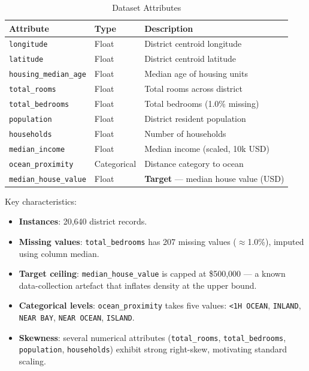 \documentclass[conference]{IEEEtran}
\begin{document}
\begin{table}[H]
\centering
\caption{Dataset Attributes}
\label{tab:attributes}
\begin{tabular}{@{}llp{3.5cm}@{}}
\toprule
\textbf{Attribute} & \textbf{Type} & \textbf{Description} \\
\midrule
\texttt{longitude}           & Float   & District centroid longitude \\
\texttt{latitude}            & Float   & District centroid latitude \\
\texttt{housing\_median\_age}& Float   & Median age of housing units \\
\texttt{total\_rooms}        & Float   & Total rooms across district \\
\texttt{total\_bedrooms}     & Float   & Total bedrooms (1.0\% missing) \\
\texttt{population}          & Float   & District resident population \\
\texttt{households}          & Float   & Number of households \\
\texttt{median\_income}      & Float   & Median income (scaled, 10k USD) \\
\texttt{ocean\_proximity}    & Categorical & Distance category to ocean \\
\midrule
\texttt{median\_house\_value}& Float   & \textbf{Target} — median house value (USD) \\
\bottomrule
\end{tabular}
\end{table}

Key characteristics:
\begin{itemize}
    \item \textbf{Instances}: 20,640 district records.
    \item \textbf{Missing values}: \texttt{total\_bedrooms} has 207 missing values ($\approx$1.0\%), imputed using column median.
    \item \textbf{Target ceiling}: \texttt{median\_house\_value} is capped at \$500,000 — a known data-collection artefact that inflates density at the upper bound.
    \item \textbf{Categorical levels}: \texttt{ocean\_proximity} takes five values: \texttt{<1H OCEAN}, \texttt{INLAND}, \texttt{NEAR BAY}, \texttt{NEAR OCEAN}, \texttt{ISLAND}.
    \item \textbf{Skewness}: several numerical attributes (\texttt{total\_rooms}, \texttt{total\_bedrooms}, \texttt{population}, \texttt{households}) exhibit strong right-skew, motivating standard scaling.
\end{itemize}
\end{document}
